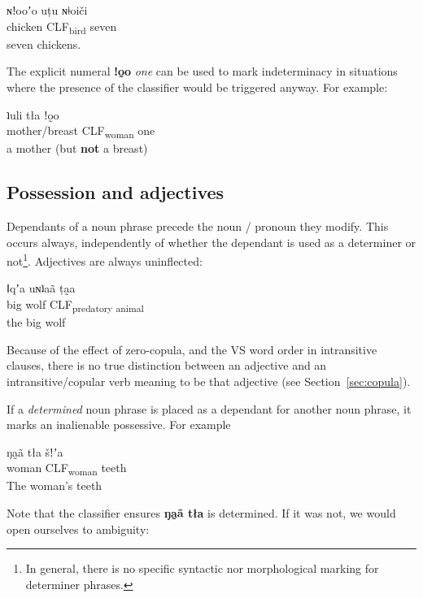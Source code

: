 \documentclass[11pt,a5paper]{book}
\newcommand{\qcn}[1]{\textcolor{AccentText}{\large\textbf{#1}}}
\newcommand{\transl}[2]{\qcn{#1} \emph{#2}}
\newcommand{\grammsc}[1]{\textsc{#1}}
\newcommand{\CLF}[1]{\grammsc{CLF}\textsubscript{#1}}
\begin{document}
\begin{exe}
\ex
\gll ɴǃooʼo uṭu ɴǂoiči\\
chicken \CLF{bird} seven\\
\glt seven chickens.
\end{exe}

The explicit numeral \transl{ǃo̰o}{one} can be used to mark indeterminacy in situations where the presence of the classifier would be triggered anyway. For example:

\begin{exe}
\ex
\gll ʇuli tła ǃo̰o\\
mother/breast \CLF{woman} one\\
\glt a mother (but \textbf{not} a breast)
\end{exe}





\subsection{Possession and adjectives}

Dependants of a noun phrase precede the noun / pronoun they modify. This occurs always, independently of whether the dependant is used as a determiner or not\footnote{In general, there is no specific syntactic nor morphological marking for determiner phrases.}. Adjectives are always uninflected:

\begin{exe}
\ex
\gll ǁqʼa uɴʇaã ṭa̰a\\
big wolf \CLF{predatory animal}\\
\glt the big wolf
\end{exe}

Because of the effect of zero-copula, and the VS word order in intransitive clauses, there is no true distinction between an adjective and an intransitive/copular verb meaning to be that adjective (see Section~\ref{sec:copula}).

If a \emph{determined} noun phrase is placed as a dependant for another noun phrase, it marks an inalienable possessive. For example

\begin{exe}
\ex
\gll ŋa̰ã tła šǃʼa\\
woman \CLF{woman} teeth\\
\glt The woman's teeth
\end{exe}

Note that the classifier ensures \qcn{ŋa̰ã tła} is determined. If it was not, we would open ourselves to ambiguity:
\end{document}
